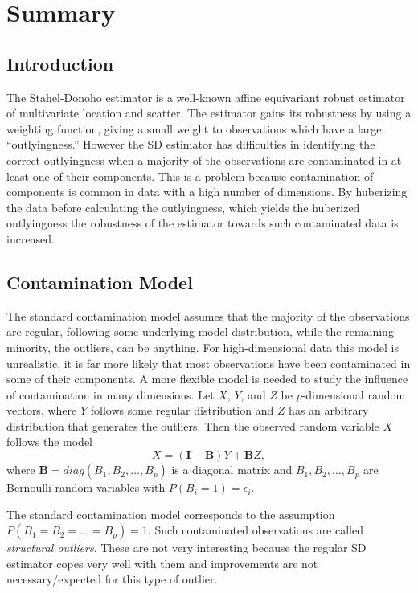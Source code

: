 \section{Summary}
\subsection{Introduction}
The Stahel-Donoho estimator is a well-known affine equivariant robust estimator
of multivariate location and scatter.
The estimator gains its robustness by using a weighting function, giving a
small weight to observations which have a large ``outlyingness.''
However the SD estimator has difficulties in identifying the correct
outlyingness when a majority of the observations are contaminated in at least
one of their components.
This is a problem because contamination of components is common in data with
a high number of dimensions.
By huberizing the data before calculating the outlyingness, which yields the
huberized outlyingness the robustness of the estimator towards such
contaminated data is increased.

\subsection{Contamination Model}
The standard contamination model assumes that the majority of the observations
are regular, following some underlying model distribution, while the
remaining minority, the outliers, can be anything.
For high-dimensional data this model is unrealistic, it is far more likely that
most observations have been contaminated in some of their components.
A more flexible model is needed to study the influence of contamination in
many dimensions.
Let $X$, $Y$, and $Z$ be $p$-dimensional random vectors, where $Y$ follows
some regular distribution and $Z$ has an arbitrary distribution that generates
the outliers.
Then the observed random variable $X$ follows the model
    \[ X = (\mathbf{I} - \mathbf{B})Y + \mathbf{B}Z, \]
where $\mathbf{B} = diag(\mathit{B}_1, \mathit{B}_2, \dots, \mathit{B}_p)$
is a diagonal matrix and $\mathit{B}_1, \mathit{B}_2, \dots, \mathit{B}_p$
are Bernoulli random variables with $P(\mathit{B}_i = 1) = \epsilon_i$.

The standard contamination model corresponds to the assumption
$P(\mathit{B}_1 = \mathit{B}_2 = \dots = \mathit{B}_p) = 1$.
Such contaminated observations are called \emph{structural outliers}.
These are not very interesting because the regular SD estimator copes very
well with them and improvements are not necessary/expected for this type of
outlier.

